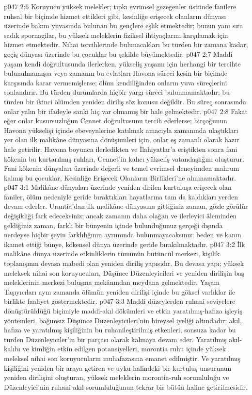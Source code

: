 \vs p047 2:6 Koruyucu yüksek melekler; tıpkı evrimsel gezegenler üstünde fanilere ruhsal bir biçimde hizmet ettikleri gibi, kesinliğe erişecek olanların dünyası üzerinde bakım yuvasında bulunan bu gençlere eşlik etmektedir; bunun yanı sıra sadık spornagilar, bu yüksek meleklerin fiziksel ihtiyaçlarını karşılamak için hizmet etmektedir. Nihai tercihlerinde bulunacakları bu türden bir zamana kadar, geçiş dünyası üzerinde bu çocuklar bu şekilde büyümektedir.
\vs p047 2:7 Maddi yaşam kendi doğrultusunda ilerlerken, yükseliş yaşamı için herhangi bir tercihte bulunulmamışsa veya zamanın bu evlatları Havona süreci kesin bir biçimde karşısında karar vermemişlerse; ölüm kendiliğinden onların yuva süreçlerini sonlandırır. Bu türden durumlarda hiçbir yargı süreci bulunmamaktadır; bu türden bir ikinci ölümden yeniden diriliş söz konusu değildir. Bu süreç sonrasında onlar yalın bir ifadeyle sanki hiç var olmamış bir hale gelmektedir.
\vs p047 2:8 Fakat eğer onlar kusursuzluğun Cennet doğrultusunu tercih ederlerse; birçoğunun Havona yükselişi içinde ebeveynlerine katılmak amacıyla zamanında ulaştıkları yer olan ilk malikâne dünyasına dönüşümleri için, onlar eş zamanlı olarak hazır hale getirilir. Havona boyunca ilerledikten ve İlahiyatlar’a eriştikten sonra fani kökenin bu kurtarılmış ruhları, Cennet’in kalıcı yükseliş vatandaşlığını oluşturur. Fani kökenin dünyaları üzerinde değerli ve temel evrimsel deneyimden mahrum kalmış bu çocuklar, Kesinliğe Erişecek Olanların Birlikleri’ne alınmamaktadır.
\vs p047 3:1 Malikâne dünyaları üzerinde yeniden dirilen kurtuluşa erişecek olan faniler, ölüm nedeniyle geride bıraktıkları hayatlarına tam da kaldıkları yerden devam ederler. Urantia’dan ilk malikâne dünyasına gittiğiniz zaman, gözle görülür değişikliği fark edeceksiniz; ancak zamanın daha olağan ve ilerleyici âleminden geldiğiniz zaman, farklı bir bünyenin içinde bulunduğunuz gerçeği dışında nerdeyse hiçbir şeyin farklılığının ayrımında bulunmayacaksınız; beden ve kanın ikamet ettiği bünye, kökensel dünya üzerinde geride bırakılmaktadır.
\vs p047 3:2 İlk malikâne dünya üzerinde etkinliklerin tümünün bütüncül merkezi, kişilik toplanışının devasa mabedi olan yeniden diriliş yapısıdır. Bu devasa yapı; yüksek meleksek nihai son koruyucuları, Düşünce Düzenleyicileri ve yeniden dirilişin baş meleklerinin merkezi buluşma mekânından meydana gelmektedir. Yaşam Taşıyıcıları aynı zamanda ölümün yeniden dirilişi içinde bu göksel varlıklar ile birlikte faaliyet göstermektedir.
\vs p047 3:3 Maddi düzeylerden ruhani seviyelere dönüştürüldüğü biçimiyle maddi\hyp{}akıl dökümleri ve etkin yaratılmış\hyp{}hafıza işleyiş yöntemleri, bağımsız Düşünce Düzenleyicileri’nin bireysel iyeliği altındadır; akıl, hafıza ve yaratılmış kişiliğinin bu ruhanileştirilmiş etkenleri, sonsuza kadar bu türden Düzenleyiciler’in bir parçası olarak kalmaya devam eder. Yaratılmış akıl\hyp{}kalıbı ve kimliğin etkin edilgen potansiyelleri, morontia ruhu içinde yüksek meleksel nihai son koruyucuların muhafazasına emanet edilmiştir. Ve yaratılmış kişiliğini yeniden bir araya getiren ve uyku halindeki bir kurtuluş unsurunun yeniden dirilişini oluşturan, yüksek meleklerin morontia\hyp{}ruh sorumluluğu ve Düzenleyici’nin ruhani\hyp{}akıl sorumluluğunun tekrar bir bütün haline getirilmesidir.

